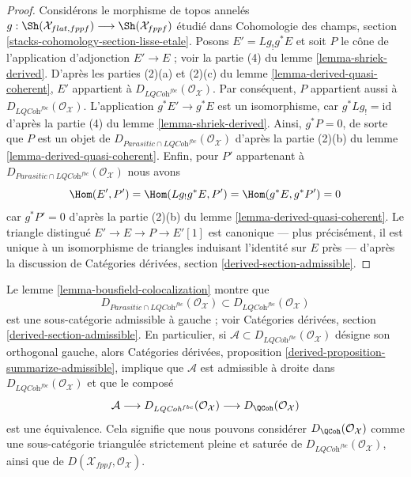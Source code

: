 \begin{proof}
Considérons le morphisme de topos annelés
$g : \Sh(\mathcal{X}_{flat, fppf}) \longrightarrow \Sh(\mathcal{X}_{fppf})$
étudié dans Cohomologie des champs, section
\ref{stacks-cohomology-section-lisse-etale}.
Posons $E' = Lg_!g^*E$ et soit $P$ le cône de l'application d'adjonction
$E' \to E$ ; voir la partie (4) du lemme \ref{lemma-shriek-derived}. D'après
les parties (2)(a) et (2)(c) du lemme
\ref{lemma-derived-quasi-coherent}, $E'$ appartient à
$D_{\textit{LQCoh}^{fbc}}(\mathcal{O}_\mathcal{X})$. Par conséquent, $P$
appartient aussi à $D_{\textit{LQCoh}^{fbc}}(\mathcal{O}_\mathcal{X})$.
L'application $g^*E' \to g^*E$ est un isomorphisme, car
$g^*Lg_! = \text{id}$ d'après la partie (4) du lemme
\ref{lemma-shriek-derived}. Ainsi, $g^*P = 0$, de sorte que $P$ est un objet de
$D_{\textit{Parasitic} \cap \textit{LQCoh}^{fbc}}(\mathcal{O}_\mathcal{X})$
d'après la partie (2)(b) du lemme \ref{lemma-derived-quasi-coherent}. Enfin,
pour $P'$ appartenant à
$D_{\textit{Parasitic} \cap \textit{LQCoh}^{fbc}}(\mathcal{O}_\mathcal{X})$
nous avons
$$
\Hom(E', P') = \Hom(Lg_!g^*E, P') = \Hom(g^*E, g^*P') = 0
$$
car $g^*P' = 0$ d'après la partie (2)(b) du lemme
\ref{lemma-derived-quasi-coherent}. Le triangle distingué
$E' \to E \to P \to E'[1]$ est canonique — plus précisément, il est unique à
un isomorphisme de triangles induisant l'identité sur $E$ près — d'après la
discussion de Catégories dérivées, section \ref{derived-section-admissible}.
\end{proof}

\begin{remark}
\label{remark-QCoh-admissible}
Le lemme \ref{lemma-bousfield-colocalization} montre que
$$
D_{\textit{Parasitic} \cap \textit{LQCoh}^{fbc}}(\mathcal{O}_\mathcal{X})
\subset
D_{\textit{LQCoh}^{fbc}}(\mathcal{O}_\mathcal{X})
$$
est une sous-catégorie admissible à gauche ; voir Catégories dérivées, section
\ref{derived-section-admissible}. En particulier, si
$\mathcal{A} \subset D_{\textit{LQCoh}^{fbc}}(\mathcal{O}_\mathcal{X})$
désigne son orthogonal gauche, alors Catégories dérivées, proposition
\ref{derived-proposition-summarize-admissible}, implique que $\mathcal{A}$ est
admissible à droite dans
$D_{\textit{LQCoh}^{fbc}}(\mathcal{O}_\mathcal{X})$ et que le composé
$$
\mathcal{A} \longrightarrow
D_{\textit{LQCoh}^{fbc}}(\mathcal{O}_\mathcal{X}) \longrightarrow
D_\QCoh(\mathcal{O}_\mathcal{X})
$$
est une équivalence. Cela signifie que nous pouvons considérer
$D_\QCoh(\mathcal{O}_\mathcal{X})$ comme une sous-catégorie triangulée
strictement pleine et saturée de
$D_{\textit{LQCoh}^{fbc}}(\mathcal{O}_\mathcal{X})$, ainsi que de
$D(\mathcal{X}_{fppf}, \mathcal{O}_\mathcal{X})$.
\end{remark}





